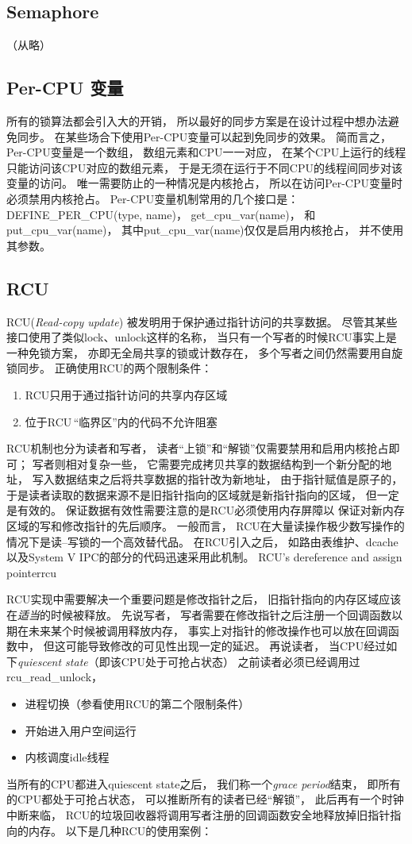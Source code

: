 \subsection{Semaphore}
（从略）
\subsection{Per-CPU 变量}
所有的锁算法都会引入大的开销，
所以最好的同步方案是在设计过程中想办法避免同步。
在某些场合下使用Per-CPU变量可以起到免同步的效果。
简而言之，
Per-CPU变量是一个数组，
数组元素和CPU一一对应，
在某个CPU上运行的线程只能访问该CPU对应的数组元素，
于是无须在运行于不同CPU的线程间同步对该变量的访问。
唯一需要防止的一种情况是内核抢占，
所以在访问Per-CPU变量时必须禁用内核抢占。
Per-CPU变量机制常用的几个接口是：
DEFINE\_PER\_CPU(type, name)，
get\_cpu\_var(name)，
和put\_cpu\_var(name)，
其中put\_cpu\_var(name)仅仅是启用内核抢占，
并不使用其参数。

\subsection{RCU}
RCU({\em Read-copy update})%
被发明用于保护通过指针访问的共享数据。
尽管其某些接口使用了类似lock、unlock这样的名称，
当只有一个写者的时候RCU事实上是一种免锁方案，
亦即无全局共享的锁或计数存在，
多个写者之间仍然需要用自旋锁同步。
正确使用RCU的两个限制条件：
\begin{enumerate}
  \item RCU只用于通过指针访问的共享内存区域
  \item 位于RCU\,``临界区''内的代码不允许阻塞
\end{enumerate}

RCU机制也分为读者和写者，
读者``上锁''和``解锁''仅需要禁用和启用内核抢占即可；
写者则相对复杂一些，
它需要完成拷贝共享的数据结构到一个新分配的地址，
写入数据结束之后将共享数据的指针改为新地址，
由于指针赋值是原子的，
于是读者读取的数据来源不是旧指针指向的区域就是新指针指向的区域，
但一定是有效的。
保证数据有效性需要注意的是RCU必须使用内存屏障以%
保证对新内存区域的写和修改指针的先后顺序。
一般而言，
RCU在大量读操作极少数写操作的情况下是读--写锁的一个高效替代品。
在RCU引入之后，
如路由表维护、dcache以及System V IPC的部分的代码迅速采用此机制。
              {RCU's dereference and assign pointer}{rcu}

RCU实现中需要解决一个重要问题是修改指针之后，
旧指针指向的内存区域应该在{\em 适当}的时候被释放。
先说写者，
写者需要在修改指针之后注册一个回调函数以期在未来某个时候被调用释放内存，
事实上对指针的修改操作也可以放在回调函数中，
但这可能导致修改的可见性出现一定的延迟。
再说读者，
当CPU经过如下{\em quiescent state}（即该CPU处于可抢占状态）%
之前读者必须已经调用过rcu\_read\_unlock，
\begin{itemize}
  \item 进程切换（参看使用RCU的第二个限制条件）
  \item 开始进入用户空间运行
  \item 内核调度idle线程
\end{itemize}
当所有的CPU都进入quiescent state之后，
我们称一个{\em grace period}结束，
即所有的CPU都处于可抢占状态，
可以推断所有的读者已经``解锁''，
此后再有一个时钟中断来临，
RCU的垃圾回收器将调用写者注册的回调函数安全地释放掉旧指针指向的内存。
以下是几种RCU的使用案例：

